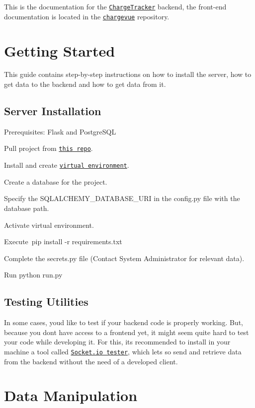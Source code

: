 This is the documentation for the \href{https://github.com/ritstudentgovernment/chargeflask}{\tt Charge\+Tracker} backend, the front-\/end documentation is located in the \href{https://github.com/ritstudentgovernment/chargevue}{\tt chargevue} repository.\hypertarget{index_gettingstarted}{}\section{Getting Started}\label{index_gettingstarted}
This guide contains step-\/by-\/step instructions on how to install the server, how to get data to the backend and how to get data from it.\hypertarget{index_serverinstall}{}\subsection{Server Installation}\label{index_serverinstall}
Prerequisites\+: Flask and Postgre\+S\+QL
\begin{DoxyEnumerate}
\item Pull project from \href{https://github.com/ritstudentgovernment/chargeflask}{\tt this repo}.
\item Install and create \href{http://python-guide-pt-br.readthedocs.io/en/latest/dev/virtualenvs/}{\tt virtual environment}.
\item Create a database for the project.
\item Specify the {\ttfamily S\+Q\+L\+A\+L\+C\+H\+E\+M\+Y\+\_\+\+D\+A\+T\+A\+B\+A\+S\+E\+\_\+\+U\+RI} in the {\ttfamily config.\+py} file with the database path.
\item Activate virtual environment.
\item Execute {\ttfamily pip install -\/r requirements.\+txt}
\item Complete the {\ttfamily secrets.\+py} file (Contact System Administrator for relevant data).
\item Run {\ttfamily python run.\+py}
\end{DoxyEnumerate}\hypertarget{index_testutil}{}\subsection{Testing Utilities}\label{index_testutil}
In some cases, you\textquotesingle{}d like to test if your backend code is properly working. But, because you don\textquotesingle{}t have access to a frontend yet, it might seem quite hard to test your code while developing it. For this, it\textquotesingle{}s recommended to install in your machine a tool called \href{https://electronjs.org/apps/socket-io-tester}{\tt Socket.\+io tester}, which let\textquotesingle{}s so send and retrieve data from the backend without the need of a developed client.\hypertarget{index_datamani}{}\section{Data Manipulation}\label{index_datamani}
